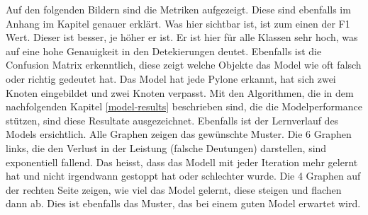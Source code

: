 Auf den folgenden Bildern sind die Metriken aufgezeigt. Diese sind ebenfalls im Anhang im Kapitel  genauer erklärt. Was hier sichtbar ist, ist zum einen der F1 Wert. Dieser ist besser, je höher er ist. Er ist hier für alle Klassen sehr hoch, was auf eine hohe Genauigkeit in den Detekierungen deutet. Ebenfalls ist die Confusion Matrix erkenntlich, diese zeigt welche Objekte das Model wie oft falsch oder richtig gedeutet hat. Das Model hat jede Pylone erkannt, hat sich zwei Knoten eingebildet und zwei Knoten verpasst. Mit den Algorithmen, die in dem nachfolgenden Kapitel \ref{model-results} beschrieben sind, die die Modelperformance stützen, sind diese Resultate ausgezeichnet. Ebenfalls ist der Lernverlauf des Models ersichtlich. Alle Graphen zeigen das gewünschte Muster. Die 6 Graphen links, die den Verlust in der Leistung (falsche Deutungen) darstellen, sind exponentiell fallend. Das heisst, dass das Modell mit jeder Iteration mehr gelernt hat und nicht irgendwann gestoppt hat oder schlechter wurde. Die 4 Graphen auf der rechten Seite zeigen, wie viel das Model gelernt, diese steigen und flachen dann ab. Dies ist ebenfalls das Muster, das bei einem guten Model erwartet wird.\cite{model-performance}


